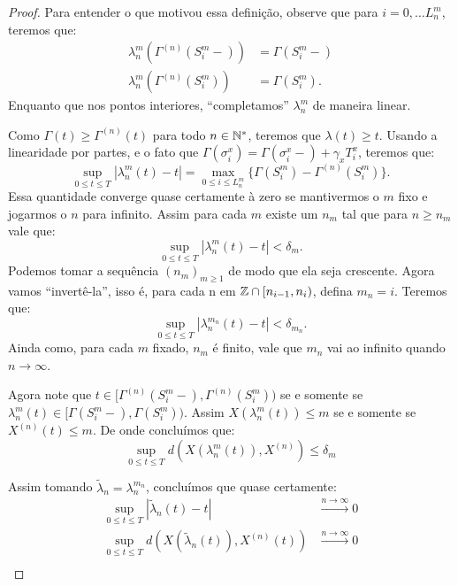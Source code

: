 \begin{proof}
  Para entender o que motivou essa definição, observe que para $i = 0,
  \ldots L_n^m$, teremos que:
  \begin{align*}
    \lambda_n^m(\Gamma^{(n)}(S_i^m-)) &= \Gamma(S_i^m-)\\
    \lambda_n^m(\Gamma^{(n)}(S_i^m)) &= \Gamma(S_i^m).
  \end{align*}
  Enquanto que nos pontos interiores, ``completamos'' $\lambda_n^m$ de
  maneira linear.

  Como $\Gamma(t) \geq \Gamma^{(n)}(t)$ para todo $n \in {\mathbb{N^*}}$, teremos
  que $\lambda(t) \geq t$. Usando a linearidade por partes, e o fato
  que $\Gamma(\sigma^x_i) = \Gamma(\sigma_i^x-) + \gamma_x T^x_i$,
  teremos que:
  \begin{displaymath}
    \sup_{0 \leq t \leq T} |\lambda_n^m(t) - t| =
    \max_{0 \leq i \leq L_n^m} \{ \Gamma(S_i^m) -
    \Gamma^{(n)}(S_i^m)\}.
  \end{displaymath}
  Essa quantidade converge quase certamente à zero se mantivermos o
  $m$ fixo e jogarmos o $n$ para infinito. Assim para cada $m$ existe
  um $n_m$ tal que para $n \geq n_m$ vale que:
  \begin{displaymath}
    \sup_{0 \leq t \leq T} |\lambda_n^m(t) - t| < \delta_m.
  \end{displaymath}
  Podemos tomar a sequência $(n_m)_{m \geq 1}$ de modo que ela seja
  crescente. Agora vamos ``invertê-la'', isso é, para cada n em ${\mathbb{Z}}
  \cap [n_{i-1}, n_i)$, defina $m_n = i$. Teremos que:
  \begin{displaymath}
    \sup_{0 \leq t \leq T} |\lambda_n^{m_n}(t) - t| < \delta_{m_n}.
  \end{displaymath}
  Ainda como, para cada $m$ fixado, $n_m$ é finito, vale que $m_n$ vai
  ao infinito quando $n \to \infty$.
  
  Agora note que $t \in [\Gamma^{(n)}(S_{i}^m-),
  \Gamma^{(n)}(S_{i}^m))$ se e somente se $\lambda_n^m(t) \in
  [\Gamma(S_{i}^m-), \Gamma(S_{i}^m))$. Assim $X(\lambda_n^m(t)) \leq
  m$ se e somente se $X^{(n)}(t) \leq m$. De onde concluímos que:
  \begin{displaymath}
    \sup_{0 \leq t \leq T} d\left(X(\lambda_n^m(t)), X^{(n)}\right)
    \leq \delta_m
  \end{displaymath}

  Assim tomando $\tilde{\lambda}_n = \lambda_n^{m_n}$, concluímos que
  quase certamente:
  \begin{align*}
    \sup_{0 \leq t \leq T} |\tilde{\lambda}_n(t) - t|
    &\xrightarrow{n\to\infty} 0 \\
    \sup_{0 \leq t \leq T} d(X(\tilde{\lambda}_n(t)), X^{(n)}(t))
    &\xrightarrow{n\to\infty} 0 \\
  \end{align*}
\end{proof}


